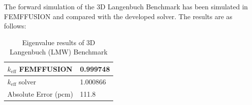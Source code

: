 The forward simulation of the 3D Langenbuch Benchmark has been simulated in FEMFFUSION \cite{vidal-ferrandizFEMFFUSIONFiniteElement2023} and compared with the developed solver. The results are as follows:

\begin{table}[H]
        \centering
        \caption{Eigenvalue results of 3D Langenbuch (LMW) Benchmark}
        \label{table:LMW_fw_results}
        \begin{tabular}{ | M{3.5cm} | M{2cm} | } 
         \hline
         $k_{\text{eff}}$ FEMFFUSION & 0.999748   \\
         \hline
         $k_{\text{eff}}$ solver & 1.000866  \\
         \hline
         Absolute Error (pcm) & 111.8  \\
         \hline
        \end{tabular}
\end{table}

